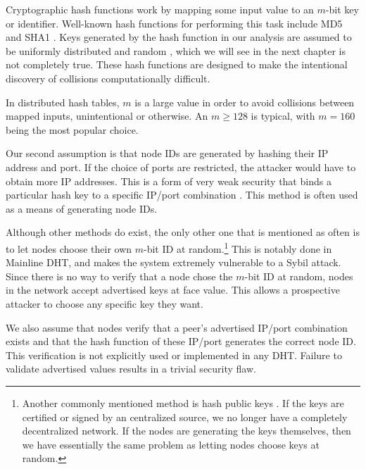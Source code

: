 Cryptographic hash functions work by mapping some input value to an $m$-bit key or identifier.
Well-known hash functions for performing this task include MD5 \cite{md5} and SHA1 \cite{sha1}.
Keys generated by the hash function in our analysis are assumed to be uniformly distributed and random \cite{bellare2004hash}, which we will see in the next chapter is not completely true. 
These hash functions are designed to make the intentional  discovery of collisions computationally difficult.

In distributed hash tables, $m$ is a large value in order to avoid collisions between mapped inputs, unintentional or otherwise. 
An $m \geq 128$ is typical, with $m = 160$ being the most popular choice.

Our second assumption is that node IDs are generated by hashing their IP address and port.
If the choice of ports are restricted, the attacker would have to obtain more IP addresses.
This is a form of very weak security that binds a particular hash key to a specific IP/port combination \cite{dinger2006defending} \cite{sit2002security}.
This method is often used as a means of generating node IDs.


Although other methods do exist, the only other one that is mentioned as often is to let nodes choose their own $m$-bit ID at random.\footnote{Another commonly mentioned method is hash public keys  \cite{dhtsec} \cite{sit2002security} \cite{pastry} \cite{castro2002secure}.  If the keys are certified or signed by an centralized source, we no longer have a completely decentralized network.  If the nodes are generating the keys themselves, then we have essentially the same problem as letting nodes choose keys at random.}
This is notably done in Mainline DHT, and makes the system extremely vulnerable to a Sybil attack.
Since there is no way to verify that a node chose the $m$-bit ID at random, nodes in the network accept advertised keys at face value.
This allows a prospective attacker to choose any specific key they want.

We also assume that nodes verify that a peer's advertised IP/port combination exists and that the hash function of these IP/port generates the correct node ID.
This verification is not explicitly used or implemented in any DHT. 
Failure to validate advertised values results in a trivial security flaw.



